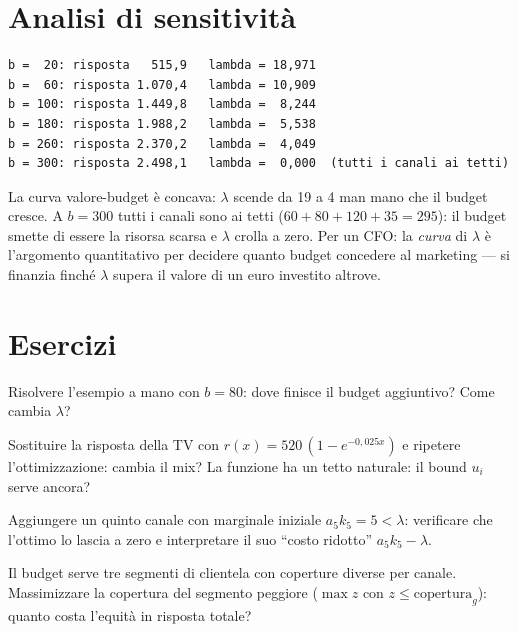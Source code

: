 \section{Analisi di sensitività}

\begin{lstlisting}[style=output]
b =  20: risposta   515,9   lambda = 18,971
b =  60: risposta 1.070,4   lambda = 10,909
b = 100: risposta 1.449,8   lambda =  8,244
b = 180: risposta 1.988,2   lambda =  5,538
b = 260: risposta 2.370,2   lambda =  4,049
b = 300: risposta 2.498,1   lambda =  0,000  (tutti i canali ai tetti)
\end{lstlisting}

\begin{spiegazione}
La curva valore-budget è concava: $\lambda$ scende da 19 a 4 man mano che il budget
cresce. A $b = 300$ tutti i canali sono ai tetti ($60+80+120+35 = 295$): il budget
smette di essere la risorsa scarsa e $\lambda$ crolla a zero. Per un CFO: la
\emph{curva} di $\lambda$ è l'argomento quantitativo per decidere quanto budget
concedere al marketing --- si finanzia finché $\lambda$ supera il valore di un euro
investito altrove.
\end{spiegazione}

\section{Esercizi}

\begin{esercizio}[verifica]
Risolvere l'esempio a mano con $b = 80$: dove finisce il budget aggiuntivo? Come
cambia $\lambda$?
\end{esercizio}

\begin{esercizio}
Sostituire la risposta della TV con $r(x) = 520\,(1 - e^{-0{,}025x})$ e ripetere
l'ottimizzazione: cambia il mix? La funzione ha un tetto naturale: il bound $u_i$
serve ancora?
\end{esercizio}

\begin{esercizio}
Aggiungere un quinto canale con marginale iniziale $a_5 k_5 = 5 < \lambda$: verificare
che l'ottimo lo lascia a zero e interpretare il suo ``costo ridotto''
$a_5 k_5 - \lambda$.
\end{esercizio}

\begin{esercizio}
Il budget serve tre segmenti di clientela con coperture diverse per canale.
Massimizzare la copertura del segmento peggiore ($\max z$ con
$z \le \text{copertura}_g$): quanto costa l'equità in risposta totale?
\end{esercizio}
